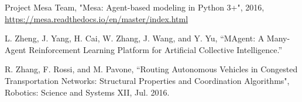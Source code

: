 \documentclass[letterpaper,10pt,draftclsnofoot,onecolumn]{IEEEtran} %
\begin{document}
\pagebreak

\begin{thebibliography}{999}
Project Mesa Team,
"Mesa: Agent-based modeling in Python 3+",
2016,
\url{https://mesa.readthedocs.io/en/master/index.html}

L. Zheng, J. Yang, H. Cai, W. Zhang, J. Wang, and Y. Yu,
“MAgent: A Many-Agent Reinforcement
Learning Platform for Artificial Collective Intelligence.”

R. Zhang, F. Rossi, and M. Pavone,
“Routing Autonomous Vehicles in Congested Transportation Networks: Structural Properties and Coordination Algorithms", Robotics: Science and Systems XII, Jul. 2016.
\end{thebibliography}
\end{document}
